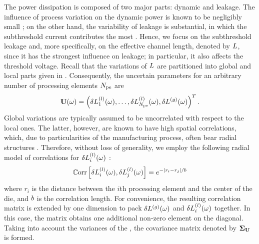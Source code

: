 The power dissipation is composed of two major parts: dynamic and leakage. The influence of process variation on the dynamic power is known to be negligibly small \cite{juan2011, juan2012, srivastava2010}; on the other hand, the variability of leakage is substantial, in which the subthreshold current contributes the most \cite{juan2011, juan2012}. Hence, we focus on the subthreshold leakage and, more specifically, on the effective channel length, denoted by $L$, since it has the strongest influence on leakage; in particular, it also affects the threshold voltage. Recall that the variations of $L$ are partitioned into global and local parts given in . Consequently, the uncertain parameters for an arbitrary number of processing elements ${N_\text{pe}}$ are
\[
  \mathbf{U}(\omega) = \left(\delta L^{(l)}_1(\omega), \dotsc, \delta L^{(l)}_{N_\text{pe}}(\omega), {\delta L^{(g)}}(\omega) \right)^T.
\]
Global variations are typically assumed to be uncorrelated with respect to the local ones. The latter, however, are known to have high spatial correlations, which, due to particularities of the manufacturing process, often bear radial structures \cite{friedberg2005, cheng2011}. Therefore, without loss of generality, we employ the following radial model of correlations for $\delta L^{(l)}_i(\omega)$ \cite{ghanem1991, ghanta2006}:
\begin{equation} \elabel{covariance-function}
  \oCorr{\lLeff_i(\o), \lLeff_j(\o)} = e^{-|r_i - r_j|/\corrLength}
\end{equation}
where $r_i$ is the distance between the $i$th processing element and the center of the die, and $b$ is the correlation length. For convenience, the resulting correlation matrix is extended by one dimension to pack ${\delta L^{(g)}}(\omega)$ and $\delta L^{(l)}_i(\omega)$ together. In this case, the matrix obtains one additional non-zero element on the diagonal. Taking into account the variances of the \rvs, the covariance matrix denoted by $\mCov_\vU$ is formed.
